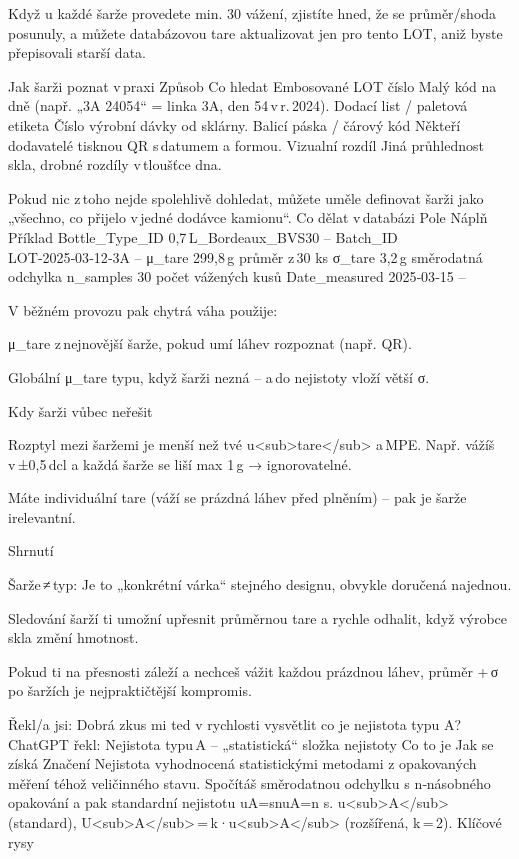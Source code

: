     Když u každé šarže provedete min. 30 vážení, zjistíte hned, že se průměr/shoda posunuly, a můžete databázovou tare aktualizovat jen pro tento LOT, aniž byste přepisovali starší data.

Jak šarži poznat v praxi
Způsob	Co hledat
Embosované LOT číslo	Malý kód na dně (např. „3A 24054“ = linka 3A, den 54 v r. 2024).
Dodací list / paletová etiketa	Číslo výrobní dávky od sklárny.
Balicí páska / čárový kód	Někteří dodavatelé tisknou QR s datumem a formou.
Vizualní rozdíl	Jiná průhlednost skla, drobné rozdíly v tloušťce dna.

Pokud nic z toho nejde spolehlivě dohledat, můžete uměle definovat šarži jako „všechno, co přijelo v jedné dodávce kamionu“.
Co dělat v databázi
Pole	Náplň	Příklad
Bottle_Type_ID	0,7 L_Bordeaux_BVS30	–
Batch_ID	LOT‑2025‑03‑12‑3A	–
μ_tare	299,8 g	průměr z 30 ks
σ_tare	3,2 g	směrodatná odchylka
n_samples	30	počet vážených kusů
Date_measured	2025‑03‑15	–

V běžném provozu pak chytrá váha použije:

    μ_tare z nejnovější šarže, pokud umí láhev rozpoznat (např. QR).

    Globální μ_tare typu, když šarži nezná – a do nejistoty vloží větší σ.

Kdy šarži vůbec neřešit

    Rozptyl mezi šaržemi je menší než tvé u<sub>tare</sub> a MPE.
    Např. vážíš v ±0,5 dcl a každá šarže se liší max 1 g → ignorovatelné.

    Máte individuální tare (váží se prázdná láhev před plněním) – pak je šarže irelevantní.

Shrnutí

    Šarže ≠ typ: Je to „konkrétní várka“ stejného designu, obvykle doručená najednou.

    Sledování šarží ti umožní upřesnit průměrnou tare a rychle odhalit, když výrobce skla změní hmotnost.

    Pokud ti na přesnosti záleží a nechceš vážit každou prázdnou láhev, průměr + σ po šaržích je nejpraktičtější kompromis.

Řekl/a jsi:
Dobrá zkus mi ted v rychlosti vysvětlit co je nejistota typu A?
ChatGPT řekl:
Nejistota typu A – „statistická“ složka nejistoty
Co to je	Jak se získá	Značení
Nejistota vyhodnocená statistickými metodami z opakovaných měření téhož veličinného stavu.	Spočítáš směrodatnou odchylku s n‑násobného opakování a pak standardní nejistotu uA=snuA​=n
​s​.	u<sub>A</sub> (standard), U<sub>A</sub> = k·u<sub>A</sub> (rozšířená, k = 2).
Klíčové rysy


